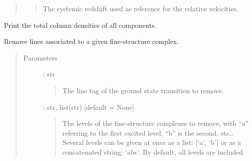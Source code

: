 \documentclass[letterpaper,10pt,english]{sphinxmanual}
\begin{document}
\begin{fulllineitems}
\begin{fulllineitems}
\begin{quote}
\begin{description}
\begin{quote}
The systemic redshift used as reference for the relative velocities.
\end{quote}

\end{description}\end{quote}

\end{fulllineitems}


\begin{fulllineitems}
\label{\detokenize{api:VoigtFit.DataSet.print_total}}
Print the total column densities of all components.

\end{fulllineitems}


\begin{fulllineitems}
\label{\detokenize{api:VoigtFit.DataSet.remove_fine_lines}}
Remove lines associated to a given fine-structure complex.
\begin{quote}\begin{description}
\item[{Parameters}] \leavevmode
{} : str
\begin{quote}

The line tag of the ground state transition to remove.
\end{quote}

 : str, list(str)   {[}default = None{]}
\begin{quote}

The levels of the fine-structure complexes to remove, with “a” referring
to the first excited level, “b” is the second, etc..
Several levels can be given at once as a list: {[}‘a’, ‘b’{]}
or as a concatenated string: ‘abc’.
By default, all levels are included.
\end{quote}

\end{description}\end{quote}

\end{fulllineitems}



\end{fulllineitems}
\end{document}
